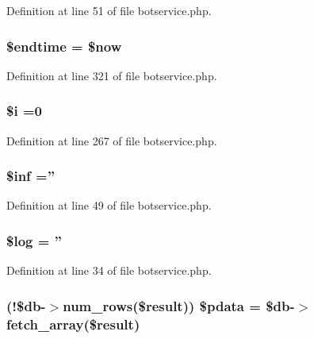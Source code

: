 Definition at line 51 of file botservice.\+php.

\hypertarget{botservice_8php_a4de03a8ac30b9635a8a8ea4a995be9ec}{
\subsubsection[{\$endtime}]{\setlength{\rightskip}{0pt plus 5cm}\$endtime = \$now}}\label{botservice_8php_a4de03a8ac30b9635a8a8ea4a995be9ec}


Definition at line 321 of file botservice.\+php.

\hypertarget{botservice_8php_a83018d9153d17d91fbcf3bc10158d34f}{
\subsubsection[{\$i}]{\setlength{\rightskip}{0pt plus 5cm}\$i =0}}\label{botservice_8php_a83018d9153d17d91fbcf3bc10158d34f}


Definition at line 267 of file botservice.\+php.

\hypertarget{botservice_8php_ae2c1d0ffaf2c5f005f5b9a540e8a926f}{
\subsubsection[{\$inf}]{\setlength{\rightskip}{0pt plus 5cm}\$inf =''}}\label{botservice_8php_ae2c1d0ffaf2c5f005f5b9a540e8a926f}


Definition at line 49 of file botservice.\+php.

\hypertarget{botservice_8php_a9a2cf15a653aee8be437f7ae474cd494}{
\subsubsection[{\$log}]{\setlength{\rightskip}{0pt plus 5cm}\$log = ''}}\label{botservice_8php_a9a2cf15a653aee8be437f7ae474cd494}


Definition at line 34 of file botservice.\+php.

\hypertarget{botservice_8php_a6378350bbbdfdf1fdd8c8e1cd0607a8d}{
\subsubsection[{\$pdata}]{ (!\$db-\/$>$num\+\_\+rows(\${\bf result})) \$pdata = \$db-\/$>$fetch\+\_\+array(\${\bf result})}}\label{botservice_8php_a6378350bbbdfdf1fdd8c8e1cd0607a8d}


